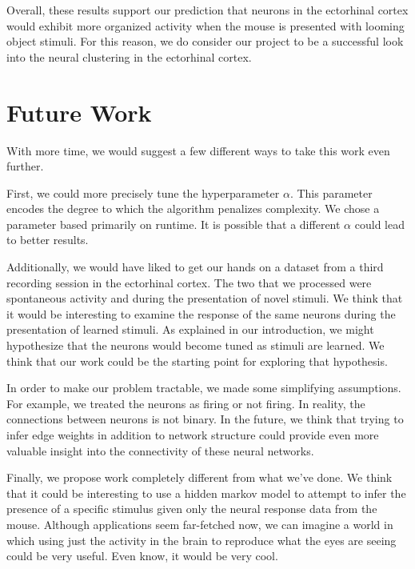 \documentclass{article}
\begin{document}
Overall, these results support our prediction that neurons in the ectorhinal 
cortex would exhibit more organized activity when the mouse is presented with 
looming object stimuli. For this reason, we do consider our project to be a 
successful look into the neural clustering in the ectorhinal cortex.\par


\section{Future Work}

With more time, we would suggest a few different ways to take this work even 
further.\par

First, we could more precisely tune the hyperparameter $\alpha$. This parameter encodes the 
degree to which the algorithm penalizes complexity. We chose a 
parameter based primarily on runtime. It is possible that a different 
$\alpha$ could lead to better results. \par

Additionally, we would have liked to get our hands on a dataset from a third 
recording session in the ectorhinal cortex. The two that we processed were 
spontaneous activity and during the presentation of novel stimuli. We think 
that it would be interesting to examine the response of the same neurons 
during the presentation of learned stimuli. As explained in our introduction, 
we might hypothesize that the neurons would become tuned as stimuli are 
learned. We think that our work could be the starting point for exploring that 
hypothesis. \par

In order to make our problem tractable, we made some simplifying assumptions. 
For example, we treated the neurons as firing or not firing. In reality, the 
connections between neurons is not binary. In the future, we think that trying 
to infer edge weights in addition to network structure could provide even more 
valuable insight into the connectivity of these neural networks. \par

Finally, we propose work completely different from what we've done. We think 
that it could be interesting to use a hidden markov model to attempt to 
infer the presence of a specific stimulus given only the neural response 
data from the mouse. Although applications seem far-fetched now, we can 
imagine a world in which using just the activity in the brain to reproduce 
what the eyes are seeing could be very useful. Even know, it would be very 
cool. \par
\end{document}
